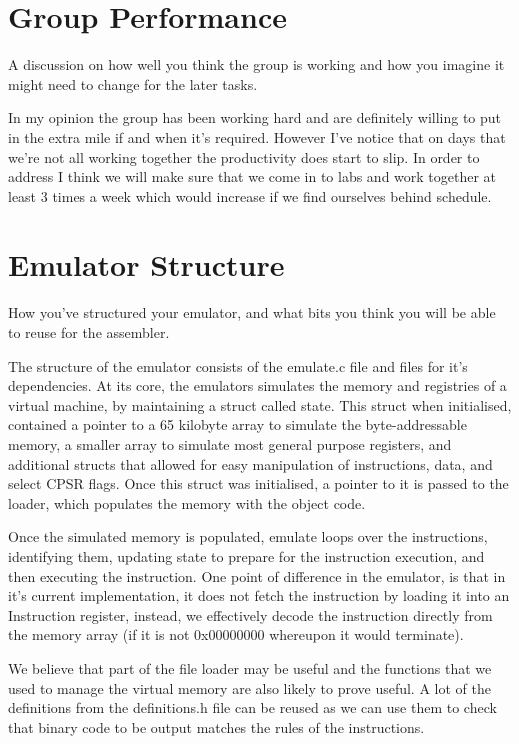 \documentclass[a4paper,12pt]{article}
\begin{document}
\section{Group Performance}

A discussion on how well you think the group is working and how you imagine it might need to
change for the later tasks.

In my opinion the group has been working hard and are definitely willing to put in the extra mile if and when it's required. However I've notice that on days that we're not all working together the productivity does start to slip. In order to address I think we will make sure that we come in to labs and work together at least 3 times a week which would increase if we find ourselves behind schedule.

\section{Emulator Structure}

How you’ve structured your emulator, and what bits you think you will be able to reuse for the
assembler.



The structure of the emulator consists of the emulate.c file and files for it's dependencies. At its core, the emulators simulates the memory and registries of a virtual machine, by maintaining a struct called state. This struct when initialised, contained a pointer to a 65 kilobyte array to simulate the byte-addressable memory, a smaller array to simulate most general purpose registers, and additional structs that allowed for easy manipulation of instructions, data, and select CPSR flags. Once this struct was initialised, a pointer to it is passed to the loader, which populates the memory with the object code.

Once the simulated memory is populated, emulate loops over the instructions, identifying them, updating state to prepare for the instruction execution, and then executing the instruction. One point of difference in the emulator, is that in it's current implementation, it does not fetch the instruction by loading it into an Instruction register, instead, we effectively decode the instruction directly from the memory array (if it is not 0x00000000 whereupon it would terminate).

We believe that part of the file loader may be useful and the functions that we used to manage the virtual memory are also likely to prove useful. A lot of the definitions from the definitions.h file can be reused as we can use them to check that binary code to be output matches the rules of the instructions.
\end{document}
